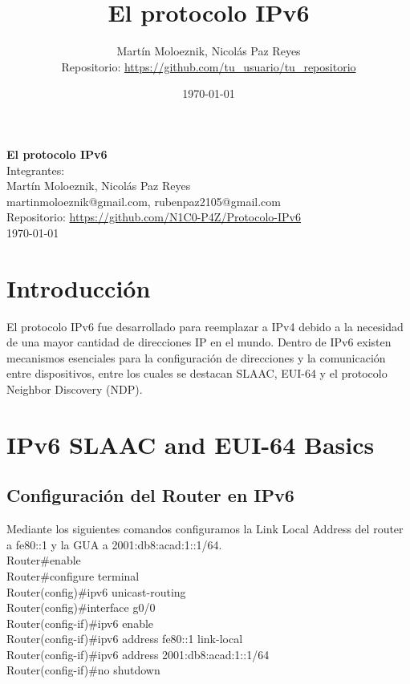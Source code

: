 \documentclass[a4paper,12pt]{article}
\title{El protocolo IPv6}
\author{Martín Moloeznik, Nicolás Paz Reyes\\[0.5em]
Repositorio: \url{https://github.com/tu_usuario/tu_repositorio}}
\date{\today}
\begin{document}
\begin{titlepage}
  \centering
  \vspace*{2cm}
  {\large \textbf{El protocolo IPv6}}\\[1.5cm]
  
  {\large Integrantes:}\\
   \bigskip
  {\large Martín Moloeznik, Nicolás Paz Reyes} \\[0.5cm]
  {\large {martinmoloeznik@gmail.com}, {rubenpaz2105@gmail.com}} \\[0.5cm]
  \bigskip
  {\large Repositorio: \url{https://github.com/N1C0-P4Z/Protocolo-IPv6}}\\[1cm]
  
  \vfill
  {\large \today}
\end{titlepage}

\tableofcontents
\newpage

\section*{Introducción}
\setcounter{section}{0}
El protocolo IPv6 fue desarrollado para reemplazar a IPv4 debido a la necesidad de una mayor cantidad de direcciones IP en el mundo. Dentro de IPv6 existen mecanismos esenciales para la configuración de direcciones y la comunicación entre dispositivos, entre los cuales se destacan SLAAC, EUI-64 y el protocolo Neighbor Discovery (NDP).

\section{IPv6 SLAAC and EUI-64 Basics}
\subsection{Configuración del Router en IPv6}


Mediante los siguientes comandos configuramos la Link Local Address del router a fe80::1 y la GUA a 2001:db8:acad:1::1/64.\\

\noindent Router\#enable\\
Router\#configure terminal\\
Router(config)\#ipv6 unicast-routing\\
Router(config)\#interface g0/0\\
Router(config-if)\#ipv6 enable\\
Router(config-if)\#ipv6 address fe80::1 link-local\\
Router(config-if)\#ipv6 address 2001:db8:acad:1::1/64\\
Router(config-if)\#no shutdown\\
\end{document}

